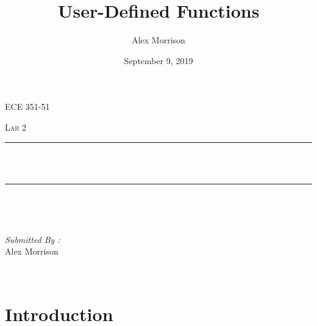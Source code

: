 \documentclass[12pt]{report}
\title{User-Defined Functions}
\author{ Alex Morrison}
\date{September 9, 2019}
\makeatletter
\let\thetitle\@title
\makeatother
\begin{document}

\begin{titlepage}
	\centering
    \vspace*{0.5 cm}
\begin{center}    \textsc{\Large ECE 351-51}\\[2.0 cm]	\end{center}%
	\textsc{\Large  Lab 2}\\[0.5 cm]				%
	\rule{\linewidth}{0.2 mm} \\[0.4 cm]
	{ \huge \bfseries \thetitle}\\
	\rule{\linewidth}{0.2 mm} \\[1.5 cm]
	
	\begin{minipage}{0.4\textwidth}
		\begin{flushleft} \large
			\end{flushleft}
			\end{minipage}~
			\begin{minipage}{0.4\textwidth}
            
			\begin{flushright} \large
			\emph{Submitted By :} \\
			Alex Morrison  
		\end{flushright}
           
	\end{minipage}\\[2 cm]
	

    
    
    
    
	
\end{titlepage}


\tableofcontents
\pagebreak

\renewcommand{\thesection}{\arabic{section}}
\section{Introduction}
 
\end{document}

